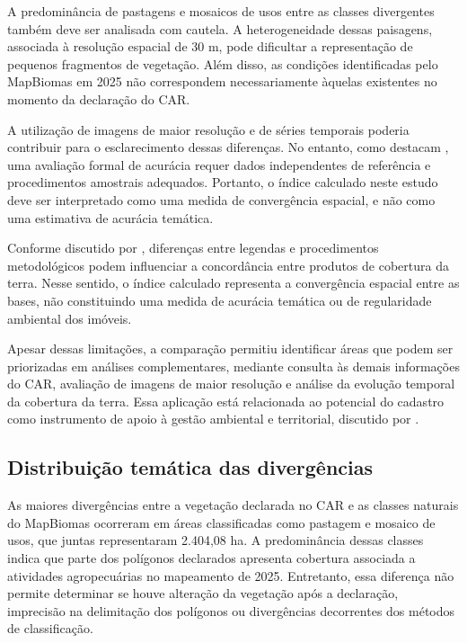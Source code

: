 A predominância de pastagens e mosaicos de usos entre as classes divergentes também deve ser analisada com cautela. A heterogeneidade dessas paisagens, associada à resolução espacial de 30 m, pode dificultar a representação de pequenos fragmentos de vegetação. Além disso, as condições identificadas pelo MapBiomas em 2025 não correspondem necessariamente àquelas existentes no momento da declaração do CAR.

A utilização de imagens de maior resolução e de séries temporais poderia contribuir para o esclarecimento dessas diferenças. No entanto, como destacam , uma avaliação formal de acurácia requer dados independentes de referência e procedimentos amostrais adequados. Portanto, o índice calculado neste estudo deve ser interpretado como uma medida de convergência espacial, e não como uma estimativa de acurácia temática.

Conforme discutido por , diferenças entre legendas e procedimentos metodológicos podem influenciar a concordância entre produtos de cobertura da terra. Nesse sentido, o índice calculado representa a convergência espacial entre as bases, não constituindo uma medida de acurácia temática ou de regularidade ambiental dos imóveis.

Apesar dessas limitações, a comparação permitiu identificar áreas que podem ser priorizadas em análises complementares, mediante consulta às demais informações do CAR, avaliação de imagens de maior resolução e análise da evolução temporal da cobertura da terra. Essa aplicação está relacionada ao potencial do cadastro como instrumento de apoio à gestão ambiental e territorial, discutido por .


\subsection{Distribuição temática das divergências}

As maiores divergências entre a vegetação declarada no CAR e as classes naturais do MapBiomas ocorreram em áreas classificadas como pastagem e mosaico de usos, que juntas representaram 2.404,08 ha. A predominância dessas classes indica que parte dos polígonos declarados apresenta cobertura associada a atividades agropecuárias no mapeamento de 2025. Entretanto, essa diferença não permite determinar se houve alteração da vegetação após a declaração, imprecisão na delimitação dos polígonos ou divergências decorrentes dos métodos de classificação.

